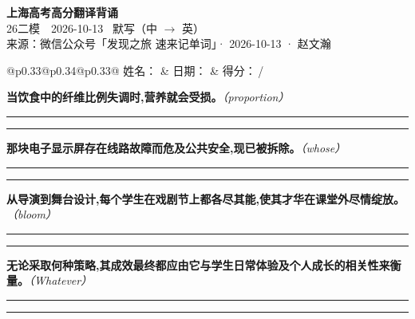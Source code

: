 \documentclass[11pt,a4paper]{article}
\newcommand{\num}[1]{\makebox[1.9em][r]{#1.}\hspace{0.3em}}
\newcommand{\wline}{\noindent\rule{\linewidth}{0.4pt}}
\newcommand{\prompt}[1]{\emph{\textcolor{tipblue}{\small（#1）}}}
\begin{document}
\pagestyle{plain}
\begin{center}
{\LARGE\bfseries 上海高考高分翻译背诵 }\\[0.25em]
{\large 26二模　2026-10-13 \quad\ 默写（中 $\to$ 英）}\\[0.35em]
{\footnotesize 来源：微信公众号「发现之旅 速来记单词」· 2026-10-13 · 赵文瀚}
\end{center}

\vspace{0.4em}
\noindent\begin{tabular}{@{}p{0.33\textwidth}@{}p{0.34\textwidth}@{}p{0.33\textwidth}@{}}
姓名：\underline{\hspace{2.0cm}} & 日期：\underline{\hspace{2.0cm}} & 得分：\underline{\hspace{1.4cm}}\,/ \\
\end{tabular}

\vspace{0.5em}

\vspace{0.8em}
\num{1}\textbf{当饮食中的纤维比例失调时,营养就会受损。}\prompt{proportion}

\vspace{0.3em}

\wline\vspace{0.3em}
\wline

\num{2}\textbf{那块电子显示屏存在线路故障而危及公共安全,现已被拆除。}\prompt{whose}

\vspace{0.3em}

\wline\vspace{0.3em}
\wline

\num{3}\textbf{从导演到舞台设计,每个学生在戏剧节上都各尽其能,使其才华在课堂外尽情绽放。}\prompt{bloom}

\vspace{0.3em}

\wline\vspace{0.3em}
\wline

\num{4}\textbf{无论采取何种策略,其成效最终都应由它与学生日常体验及个人成长的相关性来衡量。}\prompt{Whatever}

\vspace{0.3em}

\wline\vspace{0.3em}
\wline
\end{document}
